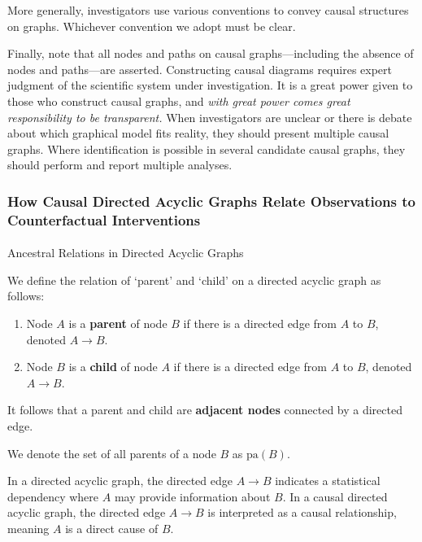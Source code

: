 \documentclass[
  single column]{article}
\makeatletter
\let\oldparagraph\paragraph
\renewcommand{\paragraph}{
    \@ifstar
      \xxxParagraphStar
      \xxxParagraphNoStar
  }
\newcommand{\xxxParagraphStar}[1]{\oldparagraph*{#1}\mbox{}}
\newcommand{\xxxParagraphNoStar}[1]{\oldparagraph{#1}\mbox{}}
\providecommand{\tightlist}{%
  \setlength{\itemsep}{0pt}\setlength{\parskip}{0pt}}\usepackage{longtable,booktabs,array}
\makeatother
\begin{document}
More generally, investigators use various conventions to convey causal
structures on graphs. Whichever convention we adopt must be clear.

Finally, note that all nodes and paths on causal graphs---including the
absence of nodes and paths---are asserted. Constructing causal diagrams
requires expert judgment of the scientific system under investigation.
It is a great power given to those who construct causal graphs, and
\emph{with great power comes great responsibility to be transparent.}
When investigators are unclear or there is debate about which graphical
model fits reality, they should present multiple causal graphs. Where
identification is possible in several candidate causal graphs, they
should perform and report multiple analyses.

\subsubsection{How Causal Directed Acyclic Graphs Relate Observations to
Counterfactual
Interventions}\label{how-causal-directed-acyclic-graphs-relate-observations-to-counterfactual-interventions}

\paragraph{Ancestral Relations in Directed Acyclic
Graphs}\label{ancestral-relations-in-directed-acyclic-graphs}

We define the relation of `parent' and `child' on a directed acyclic
graph as follows:

\begin{enumerate}
\def\labelenumi{\arabic{enumi}.}
\tightlist
\item
  Node \(A\) is a \textbf{parent} of node \(B\) if there is a directed
  edge from \(A\) to \(B\), denoted \(A \rightarrow B\).
\item
  Node \(B\) is a \textbf{child} of node \(A\) if there is a directed
  edge from \(A\) to \(B\), denoted \(A \rightarrow B\).
\end{enumerate}

It follows that a parent and child are \textbf{adjacent nodes} connected
by a directed edge.

We denote the set of all parents of a node \(B\) as \(\text{pa}(B)\).

In a directed acyclic graph, the directed edge \(A \rightarrow B\)
indicates a statistical dependency where \(A\) may provide information
about \(B\). In a causal directed acyclic graph, the directed edge
\(A \rightarrow B\) is interpreted as a causal relationship, meaning
\(A\) is a direct cause of \(B\).
\end{document}
